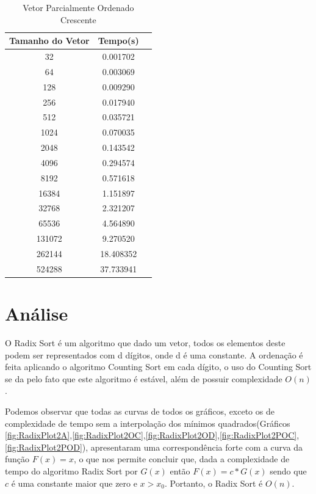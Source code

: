 \documentclass[12pt,a4paper,twoside]{report}
\begin{document}
\begin{table}[h]
  \centering
  \caption{Vetor Parcialmente Ordenado Crescente \label{tab:poc}}
  \begin{tabular}{ccc} \\\hline
  \textbf{Tamanho do Vetor}  & \textbf{Tempo(s)} \\\hline
  32                              & 0.001702          \\\hline
  64                              & 0.003069          \\\hline
  128                             & 0.009290         \\\hline
  256                             & 0.017940          \\\hline
  512                             & 0.035721         \\\hline
  1024                            & 0.070035          \\\hline
  2048                            & 0.143542          \\\hline
  4096                            & 0.294574
  \\\hline
  8192                            & 0.571618
  \\\hline
  16384                           & 1.151897
  \\\hline
  32768                           & 2.321207          \\\hline
  65536                           & 4.564890          \\\hline
  131072                          & 9.270520          \\\hline
  262144                          & 18.408352          \\\hline
  524288                          & 37.733941          \\\hline
  \end{tabular}
\end{table}


\chapter{Análise}

O Radix Sort é um algoritmo que dado um vetor, todos os elementos deste podem ser representados com d dígitos, onde d é uma constante. A ordenação é feita aplicando o algoritmo Counting Sort em cada dígito, o uso do Counting Sort se da pelo fato que este algoritmo é estável, além de possuir complexidade $O(n)$.

Podemos observar que todas as curvas de todos os gráficos, exceto os de complexidade de tempo sem a interpolação dos mínimos quadrados(Gráficos \ref{fig:RadixPlot2A},\ref{fig:RadixPlot2OC},\ref{fig:RadixPlot2OD},\ref{fig:RadixPlot2POC},\ref{fig:RadixPlot2POD}), apresentaram uma correspondência forte com a curva da função $F(x) = x$, o que nos permite concluir que, dada a complexidade de tempo do algoritmo Radix Sort por $G(x)$ então $F(x) = c * G(x)$ sendo que $c$ é uma constante maior que zero e $x > x_0$. Portanto, o Radix Sort é $O(n)$.
\end{document}
